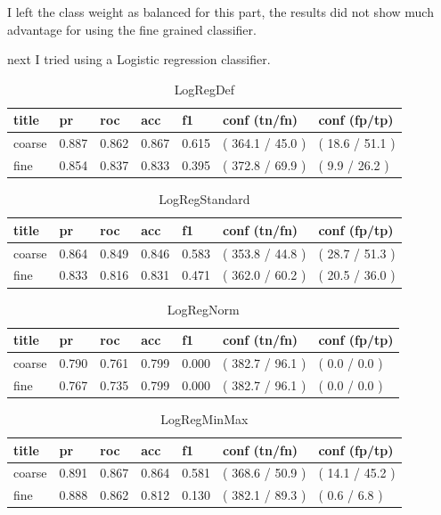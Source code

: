 \documentclass[ms]{nuthesis}
\begin{document}
\par I left the class weight as balanced for this part, the results did not show much advantage
for using the fine grained classifier.
\par next I tried using a Logistic regression classifier.



\FloatBarrier
\begin{table}[H]
\centering
\begin{tabular}{|l||l||l||l||l||l||l|}\toprule
title & pr & roc & acc & f1 & conf (tn/fn) & conf (fp/tp) \\ \midrule
coarse & 0.887 & 0.862 & 0.867 & 0.615 & ( 364.1 / 45.0 ) & ( 18.6 / 51.1 ) \\
fine & 0.854 & 0.837 & 0.833 & 0.395 & ( 372.8 / 69.9 ) & ( 9.9 / 26.2 ) \\ \bottomrule
\end{tabular}
\caption{LogRegDef}
\label{tab:LogRegDef}
\end{table}
\FloatBarrier

\FloatBarrier
\begin{table}[H]
\centering
\begin{tabular}{|l||l||l||l||l||l||l|}\toprule
title & pr & roc & acc & f1 & conf (tn/fn) & conf (fp/tp) \\ \midrule
coarse & 0.864 & 0.849 & 0.846 & 0.583 & ( 353.8 / 44.8 ) & ( 28.7 / 51.3 ) \\
fine & 0.833 & 0.816 & 0.831 & 0.471 & ( 362.0 / 60.2 ) & ( 20.5 / 36.0 ) \\ \bottomrule
\end{tabular}
\caption{LogRegStandard}
\label{tab:LogRegStandard}
\end{table}
\FloatBarrier

\FloatBarrier
\begin{table}[H]
\centering
\begin{tabular}{|l||l||l||l||l||l||l|}\toprule
title & pr & roc & acc & f1 & conf (tn/fn) & conf (fp/tp) \\ \midrule
coarse & 0.790 & 0.761 & 0.799 & 0.000 & ( 382.7 / 96.1 ) & ( 0.0 / 0.0 ) \\
fine & 0.767 & 0.735 & 0.799 & 0.000 & ( 382.7 / 96.1 ) & ( 0.0 / 0.0 ) \\ \bottomrule
\end{tabular}
\caption{LogRegNorm}
\label{tab:LogRegNorm}
\end{table}
\FloatBarrier

\FloatBarrier
\begin{table}[H]
\centering
\begin{tabular}{|l||l||l||l||l||l||l|}\toprule
title & pr & roc & acc & f1 & conf (tn/fn) & conf (fp/tp) \\ \midrule
coarse & 0.891 & 0.867 & 0.864 & 0.581 & ( 368.6 / 50.9 ) & ( 14.1 / 45.2 ) \\
fine & 0.888 & 0.862 & 0.812 & 0.130 & ( 382.1 / 89.3 ) & ( 0.6 / 6.8 ) \\ \bottomrule
\end{tabular}
\caption{LogRegMinMax}
\label{tab:LogRegMinMax}
\end{table}
\FloatBarrier
\end{document}

